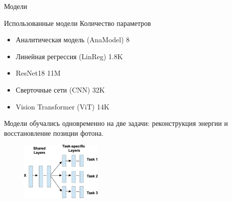 \documentclass[9pt]{beamer}
\begin{document}
\begin{frame}{Модели}
    \begin{block}{Использованные модели \hfill Количество параметров} %
        \begin{itemize}
            \item Аналитическая модель (AnaModel) \hfill 8
            \item Линейная регрессия (LinReg) \hfill 1.8K %
            \item ResNet18 \hfill 11M %
            \item Сверточные сети (CNN) \hfill 32K %
            \item Vision Transformer (ViT) \hfill 14K %
        \end{itemize}
    \end{block}

    \begin{block}{}
        Модели обучались одновременно на две задачи: реконструкция энергии и восстановление позиции фотона.
        \begin{figure}
            \centering
            \includegraphics[width=0.35\textwidth]{images/multitask.png}
        \end{figure}
    \end{block}
\end{frame}
\end{document}
